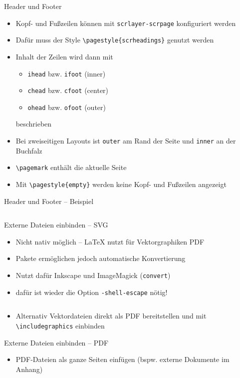 \documentclass[presentation,aspectratio=169]{beamer}
\begin{document}
\begin{frame}[fragile]{Header und Footer}
  \begin{itemize}
    \item Kopf- und Fußzeilen können mit \verb|scrlayer-scrpage| konfiguriert werden
    \item Dafür muss der Style \verb|\pagestyle{scrheadings}| genutzt werden
    \item Inhalt der Zeilen wird dann mit
      \begin{itemize}
        \item \verb|ihead| bzw. \verb|ifoot| (inner)
        \item \verb|chead| bzw. \verb|cfoot| (center)
        \item \verb|ohead| bzw. \verb|ofoot| (outer)
      \end{itemize}
      beschrieben
    \item Bei zweiseitigen Layouts ist \verb|outer| am Rand der Seite und \verb|inner| an der Buchfalz
    \item \verb|\pagemark| enthält die aktuelle Seite
    \item Mit \verb|\pagestyle{empty}| werden keine Kopf- und Fußzeilen angezeigt
  \end{itemize}
\end{frame}

\begin{frame}[fragile]{Header und Footer -- Beispiel}
  \inputminted{latex}{codebeispiele/header-footer.tex}
\end{frame}

\begin{frame}[fragile]{Externe Dateien einbinden -- SVG}
  \begin{itemize}
    \item Nicht nativ möglich -- \LaTeX{} nutzt für Vektorgraphiken PDF
    \item Pakete ermöglichen jedoch automatische Konvertierung
    \item Nutzt dafür Inkscape und ImageMagick (\verb|convert|)
    \item dafür ist wieder die Option \verb|-shell-escape| nötig!
    \inputminted{latex}{codebeispiele/include-svg.tex}
    \item Alternativ Vektordateien direkt als PDF bereitstellen und mit \verb|\includegraphics| einbinden
  \end{itemize}
\end{frame}

\begin{frame}[fragile]{Externe Dateien einbinden -- PDF}
  \begin{itemize}
    \item PDF-Dateien als ganze Seiten einfügen (bspw. externe Dokumente im Anhang)
  \end{itemize}
\end{frame}
\end{document}
